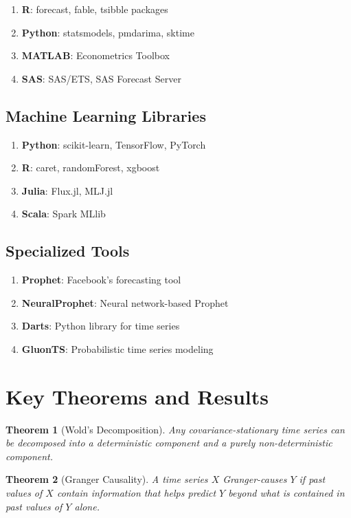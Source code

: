 \documentclass[11pt,a4paper]{article}
\newtheorem{theorem}{Theorem}[section]
\begin{document}
\begin{enumerate}
\item \textbf{R}: forecast, fable, tsibble packages
\item \textbf{Python}: statsmodels, pmdarima, sktime
\item \textbf{MATLAB}: Econometrics Toolbox
\item \textbf{SAS}: SAS/ETS, SAS Forecast Server
\end{enumerate}

\subsection{Machine Learning Libraries}

\begin{enumerate}
\item \textbf{Python}: scikit-learn, TensorFlow, PyTorch
\item \textbf{R}: caret, randomForest, xgboost
\item \textbf{Julia}: Flux.jl, MLJ.jl
\item \textbf{Scala}: Spark MLlib
\end{enumerate}

\subsection{Specialized Tools}

\begin{enumerate}
\item \textbf{Prophet}: Facebook's forecasting tool
\item \textbf{NeuralProphet}: Neural network-based Prophet
\item \textbf{Darts}: Python library for time series
\item \textbf{GluonTS}: Probabilistic time series modeling
\end{enumerate}

\section{Key Theorems and Results}

\begin{theorem}[Wold's Decomposition]
Any covariance-stationary time series can be decomposed into a deterministic component and a purely non-deterministic component.
\end{theorem}

\begin{theorem}[Granger Causality]
A time series $X$ Granger-causes $Y$ if past values of $X$ contain information that helps predict $Y$ beyond what is contained in past values of $Y$ alone.
\end{theorem}
\end{document}
